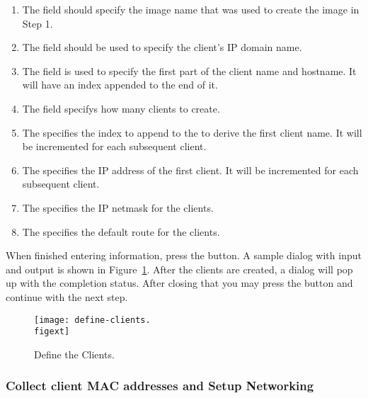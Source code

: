 \begin{enumerate}

\item The  field should specify the image name that was used to 
create the image in Step 1.

\item The  field should be used to specify the client's IP
domain name.

\item The  field is used to specify the first part of the 
client name and hostname. It will have an index appended to the end of it.

\item The  field specifys how many clients to create.

\item The  specifies the index to append
to the  to derive the first client name. It will be incremented
for each subsequent client.

\item The  specifies the IP address of the first client. It 
will be incremented for each subsequent client.

\item The  specifies the IP netmask for the clients.

\item The  specifies the default route for the clients.

\end{enumerate}
  
When finished entering information, press the  button.
A sample dialog with input and output is shown in
Figure~\ref{fig:detailed-define-clients}. After the clients are created,
a dialog will pop up with the completion status. After closing that 
you may press the  button and continue with the next step.

\begin{figure}[htbp]
  \begin{center}
    \texttt{[image: define-clients.\\figext]}
    \caption{Define the Clients.}
    \label{fig:detailed-define-clients}
  \end{center}
\end{figure}
    
\subsubsection{Collect client MAC addresses and Setup Networking} 

